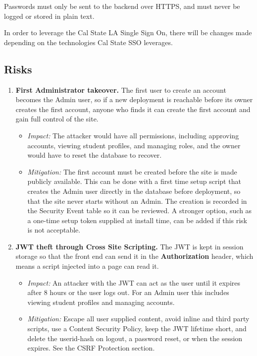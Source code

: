     Passwords must only be sent to the backend over HTTPS, and must never be logged or stored in plain text.

    In order to leverage the Cal State LA Single Sign On, there will be changes made depending on the technologies Cal State SSO leverages.

    \subsection{Risks}
        \begin{enumerate}[leftmargin=3\parindent]
            \item \textbf{First Administrator takeover.} The first user to create an account becomes the Admin user, so if a new deployment is reachable before its owner creates the first account, anyone who finds it can create the first account and gain full control of the site.
                \begin{itemize}
                    \item \textit{Impact:} The attacker would have all permissions, including approving accounts, viewing student profiles, and managing roles, and the owner would have to reset the database to recover.
                    \item \textit{Mitigation:} The first account must be created before the site is made publicly available. This can be done with a first time setup script that creates the Admin user directly in the database before deployment, so that the site never starts without an Admin. The creation is recorded in the Security Event table so it can be reviewed. A stronger option, such as a one-time setup token supplied at install time, can be added if this risk is not acceptable.
                \end{itemize}
            \item \textbf{JWT theft through Cross Site Scripting.} The JWT is kept in session storage so that the front end can send it in the \textbf{Authorization} header, which means a script injected into a page can read it.
                \begin{itemize}
                    \item \textit{Impact:} An attacker with the JWT can act as the user until it expires after 8 hours or the user logs out. For an Admin user this includes viewing student profiles and managing accounts.
                    \item \textit{Mitigation:} Escape all user supplied content, avoid inline and third party scripts, use a Content Security Policy, keep the JWT lifetime short, and delete the userid-hash on logout, a password reset, or when the session expires. See the CSRF Protection section.
                \end{itemize}
        \end{enumerate}

